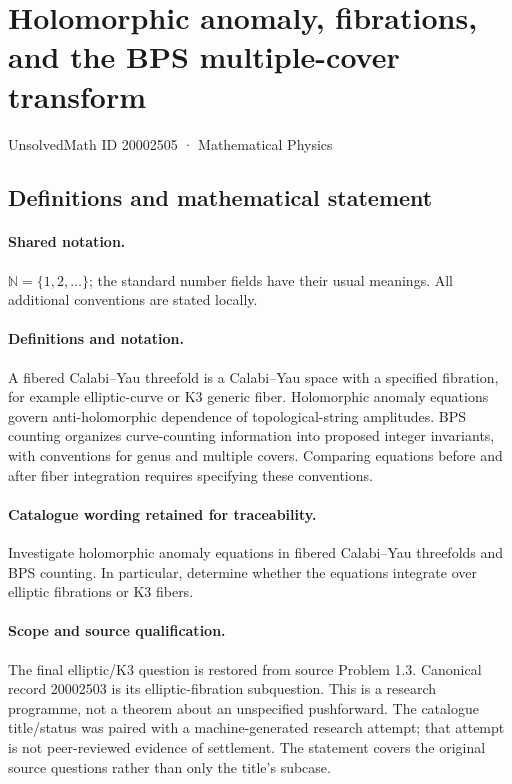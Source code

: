 \documentclass[11pt]{article}
\begin{document}
\setcounter{section}{20002504}
\section{Holomorphic anomaly, fibrations, and the BPS multiple-cover transform}\label{20002505}
{\small UnsolvedMath ID 20002505 · Mathematical Physics}
\subsection{Definitions and mathematical statement}

\paragraph{Shared notation.}$\mathbb N=\{1,2,\ldots\}$; the standard number fields have their usual meanings. All additional conventions are stated locally.


\paragraph{Definitions and notation.}A fibered Calabi--Yau threefold is a Calabi--Yau space with a specified fibration, for example elliptic-curve or K3 generic fiber. Holomorphic anomaly equations govern anti-holomorphic dependence of topological-string amplitudes. BPS counting organizes curve-counting information into proposed integer invariants, with conventions for genus and multiple covers. Comparing equations before and after fiber integration requires specifying these conventions.

\paragraph{Catalogue wording retained for traceability.}
Investigate holomorphic anomaly equations in fibered Calabi--Yau threefolds and BPS counting. In particular, determine whether the equations integrate over elliptic fibrations or K3 fibers.
\paragraph{Scope and source qualification.}The final elliptic/K3 question is restored from source Problem 1.3. Canonical record 20002503 is its elliptic-fibration subquestion. This is a research programme, not a theorem about an unspecified pushforward. The catalogue title/status was paired with a machine-generated research attempt; that attempt is not peer-reviewed evidence of settlement. The statement covers the original source questions rather than only the title’s subcase.
\end{document}
